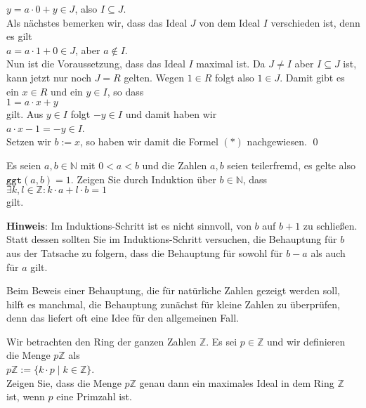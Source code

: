 $y = a \cdot 0 + y \in J$, \quad also $I \subseteq J$.
\\[0.2cm]
Als nächstes bemerken wir, dass das Ideal $J$ von dem Ideal $I$ verschieden ist, denn es gilt
\\[0.2cm]
\hspace*{1.3cm}
$a = a \cdot 1 + 0 \in J$, \quad aber \quad $a \not\in I$.
\\[0.2cm]
Nun ist die Voraussetzung, dass das Ideal $I$ maximal ist.  Da $J \not= I$ aber $I \subseteq J$ ist,
kann jetzt nur noch $J = R$ gelten.  Wegen $1 \in R$ folgt also $1 \in J$.  Damit gibt es 
ein $x \in R$ und ein $y \in I$, so dass
\\[0.2cm]
\hspace*{1.3cm}
$1 = a \cdot x + y$
\\[0.2cm]
gilt.  Aus  $y \in I$ folgt $-y \in I$ und damit haben wir
\\[0.2cm]
\hspace*{1.3cm}
$a \cdot x - 1 = -y \in I$.
\\[0.2cm]
Setzen wir $b := x$, so haben wir damit die Formel $(*)$ nachgewiesen. \qed
\pagebreak

\exercise
Es seien $a,b \in \mathbb{N}$ mit $0 < a < b$ und die Zahlen $a, b$ seien teilerfremd, es gelte also
$\mathtt{ggt}(a,b) = 1$.  Zeigen Sie durch Induktion über $b \in \mathbb{N}$, dass 
\\[0.2cm]
\hspace*{1.3cm}
$\exists k,l \in \mathbb{Z}: k \cdot a + l \cdot b = 1$
\\[0.2cm]
gilt.  
\vspace*{0.2cm}

\noindent
\textbf{Hinweis}: Im Induktions-Schritt ist es nicht sinnvoll, von $b$ auf $b+1$ zu schließen.  Statt dessen
sollten Sie im Induktions-Schritt versuchen, die Behauptung für $b$ aus der Tatsache zu folgern,
dass die Behauptung für sowohl für $b-a$ als auch für $a$ gilt. \exend

\remark
Beim Beweis einer Behauptung, die für natürliche Zahlen gezeigt werden soll, hilft es manchmal, die
Behauptung zunächst für kleine Zahlen zu überprüfen, denn das liefert oft eine Idee für den allgemeinen
Fall. 
\eox

\exercise
Wir betrachten den Ring der ganzen Zahlen $\mathbb{Z}$.  Es sei $p \in \mathbb{Z}$ und wir
definieren die Menge $p\mathbb{Z}$ als
\\[0.2cm]
\hspace*{1.3cm}
$p\mathbb{Z} := \{ k \cdot p \mid k \in \mathbb{Z} \}$.
\\[0.2cm]
Zeigen Sie, dass die Menge $p\mathbb{Z}$ genau dann ein maximales Ideal in dem Ring $\mathbb{Z}$
ist, wenn $p$ eine Primzahl ist.
\vspace*{0.2cm}

